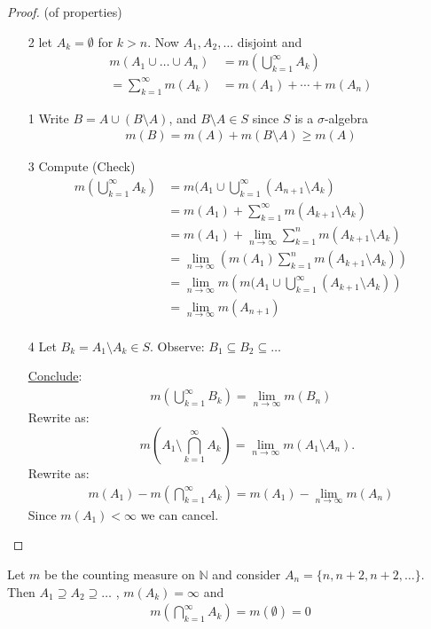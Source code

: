 \begin{proof}(of properties)
	\begin{enumerate}
		\item[2] let $A_k = \emptyset$ for $k >n$. Now $A_1, A_2, \ldots$ disjoint and
			\begin{align*}
				m(A_1 \cup \ldots \cup A_n) &= m(\bigcup_{k=1}^{\infty} A_k ) \\
				= \sum_{k=1}^{\infty} m(A_k) &= m(A_1) + \cdots + m(A_n)
			\end{align*}
		\item[1] Write $B = A \cup (B \setminus A)$, and $B \setminus A \in S$ since $S$ is a $\sigma$-algebra
			\begin{align*}
				m(B) = m(A) + m(B \setminus A) \geq m(A)
			\end{align*}
		\item[3] Compute (Check)
			\begin{align*}
				m(\bigcup_{k=1}^{\infty} A_k) &= m(A_1 \cup \bigcup_{k=1}^{\infty} (A_{n+1} \setminus A_k) \\
											  &= m(A_1) + \sum_{k=1}^{\infty} m(A_{k+1} \setminus A_k) \\
											  &= m(A_1) + \lim_{n \to \infty}  \sum_{k=1}^{n} m(A_{k+1} \setminus A_k) \\
											  &= \lim_{n \to \infty} \left(m(A_1) \sum_{k=1}^{n} m(A_{k+1} \setminus A_k) \right) \\
											  &= \lim_{n \to \infty} m \left(m(A_1 \cup \bigcup_{k=1}^{\infty} (A_{k+1} \setminus A_k) \right) \\
											  &= \lim_{n \to \infty} m (A_{n+1})  \\
			\end{align*}
		\item[4] Let $B_k = A_1 \setminus A_k \in S$. Observe: $B_1 \subseteq B_2 \subseteq \ldots$

			\underline{Conclude}:
			\begin{align*}
				m(\bigcup_{k=1}^{\infty} B_k) = \lim_{n \to \infty} m(B_n)
			\end{align*}
			Rewrite as:
			\[
				\quad m(A_1 \setminus \bigcap_{k=1}^{\infty} A_k) =
				\lim_{n \to \infty} m(A_1 \setminus A_n).
			\]
			Rewrite as:
			\begin{align*}
				m(A_1) - m(\bigcap_{k=1}^{\infty} A_k) = m(A_1) - \lim_{n \to \infty} m(A_n)
			\end{align*}
			Since $m(A_1) < \infty$ we can cancel.
	\end{enumerate}
\end{proof}

\begin{example}
	Let $m$ be the counting measure on  $\mathbb{N}$ and consider $A_n = \{n, n+2, n+2, \ldots \}$.
	Then $A_1 \supseteq A_2 \supseteq \ldots$ , $m(A_k) = \infty$ and
	\begin{align*}
		m(\bigcap_{k=1}^{\infty} A_k ) = m(\emptyset) = 0
	\end{align*}
\end{example}

